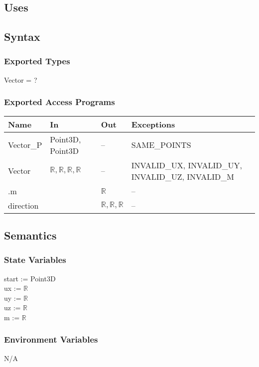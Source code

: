 \documentclass[12pt, titlepage]{article}
\begin{document}
\subsection{Uses}

\subsection{Syntax}
\subsubsection{Exported Types}
Vector = ?
\subsubsection{Exported Access Programs}
\begin{center}
	\begin{tabular}{p{4cm} p{2cm} p{2cm} p{4cm}}
		\hline
		\textbf{Name} & \textbf{In} & \textbf{Out} & \textbf{Exceptions} \\
		\hline
		Vector\_P & Point3D, Point3D & -- & SAME\_POINTS \\
		Vector & $ \mathbb{R},\mathbb{R},\mathbb{R},\mathbb{R} $ & -- & 
		INVALID\_UX, INVALID\_UY, INVALID\_UZ, INVALID\_M \\
		.m & & $\mathbb{R}$ & -- \\
		direction & & $ \mathbb{R},\mathbb{R},\mathbb{R}$  & -- 
		\\	
		\hline
	\end{tabular}
\end{center}

\subsection{Semantics}
\subsubsection{State Variables}
start := Point3D \\
ux := $\mathbb{R}$ \\
uy := $\mathbb{R}$ \\
uz := $\mathbb{R}$ \\
m := $\mathbb{R}$ \\ 

\subsubsection{Environment Variables}
N/A
\end{document}

